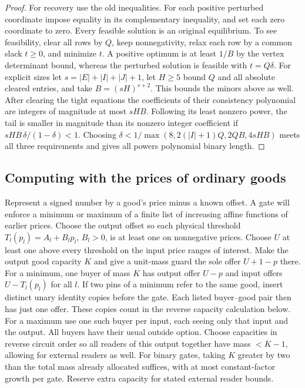 \documentclass[11pt]{article}
\begin{document}
\begin{proof}
For recovery use the old inequalities. For each positive perturbed
coordinate impose equality in its complementary inequality, and set
each zero coordinate to zero. Every feasible solution is an original
equilibrium. To see feasibility, clear all rows by \(Q\), keep
nonnegativity, relax each row by a common slack \(t\ge0\), and minimize
\(t\). A positive optimum is at least \(1/B\) by the vertex determinant
bound, whereas the perturbed solution is feasible with \(t=Q\delta\).
For explicit sizes let \(s=|E|+|I|+|J|+1\), let \(H\ge5\) bound \(Q\)
and all absolute cleared entries, and take \(B=(sH)^{s+2}\). This bounds
the minors above as well. After clearing the tight equations the coefficients
of their consistency polynomial are integers of magnitude at most \(sHB\).
Following its least nonzero power, the tail is smaller in magnitude than
its nonzero integer coefficient if \(sHB\,\delta/(1-\delta)<1\).
Choosing \(\delta<1/\max(8,2(|I|+1)Q,2QB,4sHB)\) meets all three
requirements and gives all powers polynomial binary length.
\end{proof}

\subsection{Computing with the prices of ordinary goods}

Represent a signed number by a good's price minus a known offset. A gate
will enforce a minimum or maximum of a finite list of increasing affine
functions of earlier prices. Choose the output offset so each physical
threshold \(T_l(p_l)=A_l+B_l p_l\), \(B_l>0\), is at least one on
nonnegative prices. Choose \(U\) at least one above every threshold on
the input price ranges of interest. Make the output good capacity \(K\)
and give a unit-mass guard the sole offer \(U+1-p\) there. For a minimum,
one buyer of mass \(K\) has output offer \(U-p\) and input offers
\(U-T_l(p_l)\) for all \(l\). If two pins of a minimum refer to the
same good, insert distinct unary identity copies before the gate. Each
listed buyer--good pair then has just one offer. These copies count in
the reverse capacity calculation below. For a maximum use one such buyer per input,
each seeing only that input and the output. All buyers have their usual
outside option. Choose capacities in reverse circuit order so all readers
of this output together have mass \(<K-1\), allowing for external
readers as well. For binary gates, taking \(K\) greater by two than the
total mass already allocated suffices, with at most constant-factor
growth per gate. Reserve extra capacity for stated external reader bounds.
\end{document}
